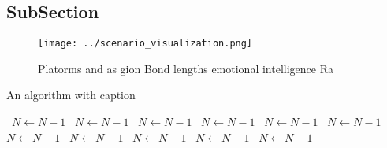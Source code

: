 \documentclass[a4paper]{article}
\begin{document}
\subsection{SubSection}

\begin{figure}
\centering
\texttt{[image: ../scenario\_visualization.png]}
\caption{Platorms and as gion Bond lengths emotional intelligence Ra
}
\end{figure}
 
\begin{algorithm}
\caption{An algorithm with caption}
\begin{algorithmic}
\    \State $N \gets N - 1$
\    \State $N \gets N - 1$
\    \State $N \gets N - 1$
\    \State $N \gets N - 1$
\    \State $N \gets N - 1$
\    \State $N \gets N - 1$
\    \State $N \gets N - 1$
\    \State $N \gets N - 1$
\    \State $N \gets N - 1$
\    \State $N \gets N - 1$
\    \State $N \gets N - 1$
\EndWhile
\end{algorithmic}
\end{algorithm}
\end{document}
